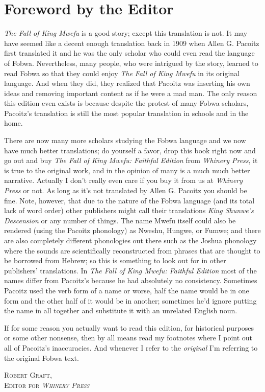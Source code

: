 \chapter*{Foreword by the Editor}
\emph{The Fall of King Mwe\-fu} is a good story; except this translation is not.
It may have seemed like a decent enough translation back in 1909 when Allen G. Pa\-co\-itz first translated it and he was the only scholar who could even read the language of Fo\-bwa.
Nevertheless, many people, who were intrigued by the story, learned to read Fo\-bwa so that they could enjoy \emph{The Fall of King Mwe\-fu} in its original language.
And when they did, they realized that Pa\-co\-itz was inserting his own ideas and removing important content as if he were a mad man.
The only reason this edition even exists is because despite the protest of many Fo\-bwa scholars, Pa\-co\-itz's translation is still the most popular translation in schools and in the home. 

There are now many more scholars studying the Fo\-bwa language and we now have much better translations;
do yourself a favor, drop this book right now and go out and buy \emph{The Fall of King Mwe\-fu: Faithful Edition} from \emph{Whinery Press}, it is true to the original work, and in the opinion of many is a much much better narrative.
Actually I don't really even care if you buy it from us at \emph{Whinery Press} or not.
As long as it's not translated by Allen G. Pa\-co\-itz you should be fine.
Note, however, that due to the nature of the Fo\-bwa language (and its total lack of word order) other publishers might call their translations \emph{King Shunwe's Descension} or any number of things. The name Mwe\-fu itself could also be rendered (using the Pa\-co\-itz phonology) as Nweshu, Hungwe, or Fumwe; and there are also completely different phonologies out there such as the Joshua phonology where the sounds are scientifically reconstructed from phrases that are thought to be borrowed from Hebrew; so this is something to look out for in other publishers' translations. In \emph{The Fall of King Mwe\-fu: Faithful Edition} most of the names differ from Pa\-co\-itz's because he had absolutely no consistency. Sometimes Pa\-co\-itz used the verb form of a name or worse, half the name would be in one form and the other half of it would be in another; sometimes he'd ignore putting the name in all together and substitute it with an unrelated English noun.

If for some reason you actually want to read this edition, for historical purposes or some other nonsense, then by all means read my footnotes where I point out all of Pa\-co\-itz's inaccuracies. And whenever I refer to the \emph{original} I'm referring to the original Fo\-bwa text.
\begin{flushright}
\textsc{
Robert Graft,\\
Editor for \emph{Whinery Press}}
\end{flushright}

